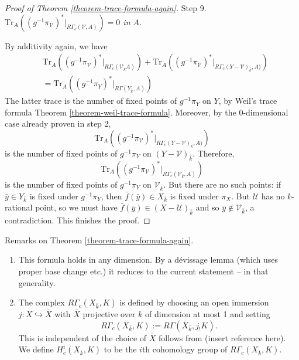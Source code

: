 \begin{proof}[Proof of Theorem \ref{theorem-trace-formula-again}]
\medskip\noindent
Step 9. {\it
$\text{Tr}_A\left((g^{-1}\pi_\mathcal{V})^*\big|_{R\Gamma_c(\mathcal{V},
A)}\right) = 0$ in $A$.}

\medskip\noindent
By additivity again, we have
\begin{eqnarray*}
&
\text{Tr}_A
\left(
(g^{-1}\pi_\mathcal{V})^*\big|_{R\Gamma_c(\mathcal{V}_{\bar k} A)}
\right)
+
\text{Tr}_A
\left(
(g^{-1}\pi_\mathcal{V})^*\big|_{R\Gamma_c(Y-\mathcal {V})_{\bar k}, A)}
\right) \\
&
=
\text{Tr}_A
\left(
(g^{-1}\pi_Y)^*\big|_{R\Gamma(Y_{\bar k}, A)}
\right)
\end{eqnarray*}
The latter trace is the number of fixed points of $g^{-1}\pi_Y$ on $Y$, by
Weil's trace formula
Theorem \ref{theorem-weil-trace-formula}.
Moreover, by the 0-dimensional case already proven in step 2,
$$
\text{Tr}_A\left((g^{-1}\pi_\mathcal{V})^*\big|_{R\Gamma_c(Y-\mathcal{V})_{\bar
k}, A)}\right)
$$
is the number of fixed points of $g^{-1}\pi_Y$ on $(Y-\mathcal{V})_{\bar k}$.
Therefore,
$$
\text{Tr}_A\left((g^{-1}\pi_\mathcal{V})^*\big|_{R\Gamma_c(\mathcal{V}_{\bar
k}, A)}\right)
$$
is the number of fixed points of $g^{-1}\pi_Y$ on $\mathcal{V}_{\bar k}$. But
there are no such points: if $\bar y\in Y_{\bar k}$ is fixed under
$g^{-1}\pi_Y$, then $\bar f(\bar y) \in X_{\bar k}$ is fixed under $\pi_X$. But
$\mathcal{U}$ has no $k$-rational point, so we must have $\bar f(\bar y)\in
(X-\mathcal{U})_{\bar k}$ and so $\bar y\notin \mathcal{V}_{\bar k}$, a
contradiction.
This finishes the proof.
\end{proof}

\begin{remark}
\label{remark-on-trace-formula-again}
Remarks on Theorem \ref{theorem-trace-formula-again}.
\begin{enumerate}
\item
This formula holds in any dimension. By a d\'evissage lemma (which uses proper
base change etc.) it reduces to the current statement -- in that generality.
\item
The complex $R\Gamma_c(X_{\bar k}, K)$ is defined by choosing an open immersion
$j: X \hookrightarrow \bar X$ with $\bar X$ projective over $k$ of dimension at
most 1 and setting
$$
R\Gamma_c(X_{\bar k}, K) := R\Gamma(\bar X_{\bar k}, j_!K).
$$
This is independent of the choice of $\bar X$ follows from
(insert reference here). We define $H^i_c(X_{\bar k}, K)$
to be the $i$th cohomology group of $R\Gamma_c(X_{\bar k}, K)$.
\end{enumerate}
\end{remark}

